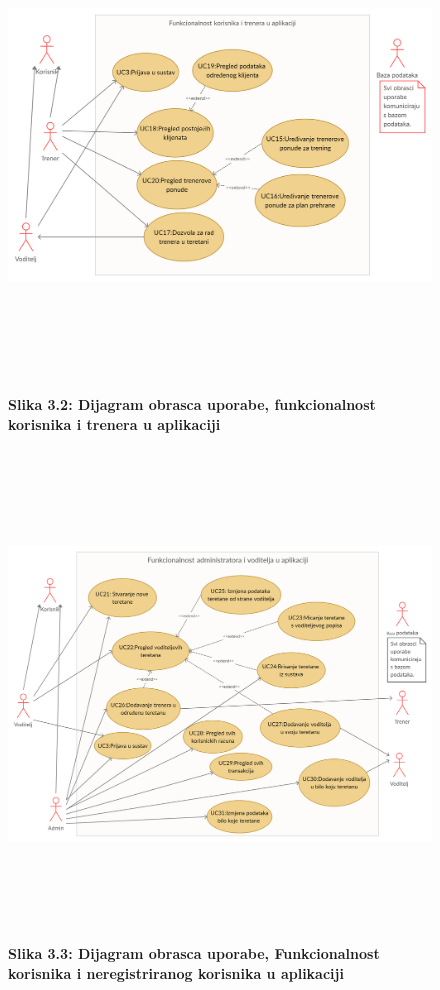 				\begin{figure}

    				\includegraphics[height=13cm,width=1.2\textwidth]{slike/obrazac2.jpg}
    				\textbf{Slika 3.2: Dijagram obrasca uporabe, funkcionalnost korisnika i trenera u aplikaciji}
				\end{figure}
				
				\begin{figure}
    				\includegraphics[height= 13cm,width=1.2\textwidth]{slike/obrazac3.jpg}
    				\textbf{Slika 3.3: Dijagram obrasca uporabe, Funkcionalnost korisnika i neregistriranog korisnika u aplikaciji}

				\end{figure}
			     
